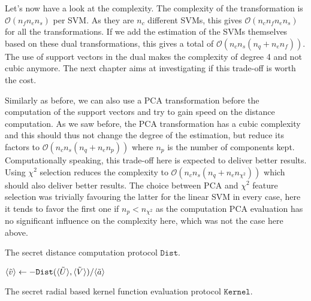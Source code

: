Let's now have a look at the complexity. The complexity of the transformation is $\mathcal{O}(n_fn_en_s)$ per SVM. As they are $n_c$ different SVMs, this gives $\mathcal{O}(n_cn_fn_en_s)$ for all the transformations. If we add the estimation of the SVMs themselves based on these dual transformations, this gives a total of $\mathcal{O}(n_cn_s(n_q+n_en_f))$. The use of support vectors in the dual makes the complexity of degree 4 and not cubic anymore. The next chapter aims at investigating if this trade-off is worth the cost.

Similarly as before, we can also use a PCA transformation before the computation of the support vectors and try to gain speed on the distance computation. As we saw before, the PCA transformation has a cubic complexity and this should thus not change the degree of the estimation, but reduce its factors to $\mathcal{O}(n_cn_s(n_q+n_en_p))$ where $n_p$ is the number of components kept. Computationally speaking, this trade-off here is expected to deliver better results. Using $\chi^2$ selection reduces the complexity to $\mathcal{O}(n_cn_s(n_q+n_en_{\chi^2}))$ which should also deliver better results. The choice between PCA and $\chi^2$ feature selection was trivially favouring the latter for the linear SVM in every case, here it tends to favor the first one if $n_p<n_{\chi^2}$ as the computation PCA evaluation has no significant influence on the complexity here, which was not the case here above.

\begin{center}
\begin{algorithm}[H]
\DontPrintSemicolon
{}
\caption{The secret distance computation protocol $\mathtt{Dist}$.}
\label{alg:sec-dist}
\end{algorithm}
\end{center}

\begin{center}
\begin{algorithm}[H]
\DontPrintSemicolon
$\langle \tilde{v} \rangle \leftarrow - \mathtt{Dist}(\langle \tilde{U} \rangle,\langle \tilde{V} \rangle) / \langle \tilde{a} \rangle$ \;
\caption{The secret radial based kernel function evaluation protocol $\mathtt{Kernel}$.}
\label{alg:sec-kernel}
\end{algorithm}
\end{center}

